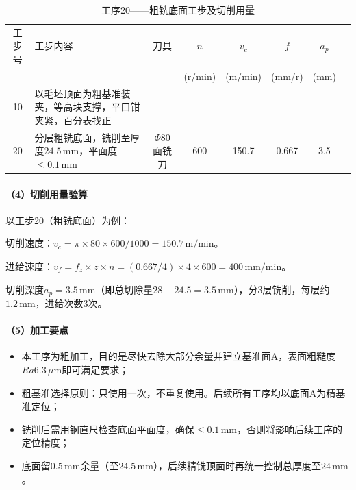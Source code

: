 \documentclass{xautCADreport}
\begin{document}
\begin{table}[H]
  \centering
  \caption{工序20——粗铣底面工步及切削用量}
  \label{tab:op20_die}
  \small
  \setlength{\tabcolsep}{5pt}
  \begin{tabular}{cp{4.5cm}cccccc}
    \toprule
    工步号 & 工步内容 & 刀具 & \multicolumn{1}{c}{$n$} & \multicolumn{1}{c}{$v_c$} & \multicolumn{1}{c}{$f$} & \multicolumn{1}{c}{$a_p$} \\
    & & & (r/min) & (m/min) & (mm/r) & (mm) \\
    \midrule
    10 & 以毛坯顶面为粗基准装夹，等高块支撑，平口钳夹紧，百分表找正 & — & — & — & — & — \\
    20 & 分层粗铣底面，铣削至厚度$24.5\,\mathrm{mm}$，平面度$\leq0.1\,\mathrm{mm}$ & $\Phi80$面铣刀 & 600 & 150.7 & 0.667 & 3.5 \\
    \bottomrule
  \end{tabular}
\end{table}

\paragraph{（4）切削用量验算}

以工步20（粗铣底面）为例：

切削速度：$v_c = \pi \times 80 \times 600 / 1000 = 150.7\,\mathrm{m/min}$。

进给速度：$v_f = f_z \times z \times n = (0.667/4) \times 4 \times 600 = 400\,\mathrm{mm/min}$。

切削深度$a_p=3.5\,\mathrm{mm}$（即总切除量$28-24.5=3.5\,\mathrm{mm}$），分3层铣削，每层约$1.2\,\mathrm{mm}$，进给次数3次。

\paragraph{（5）加工要点}

\begin{itemize}
  \item 本工序为粗加工，目的是尽快去除大部分余量并建立基准面A，表面粗糙度$Ra6.3\,\mu\mathrm{m}$即可满足要求；
  \item 粗基准选择原则：只使用一次，不重复使用。后续所有工序均以底面A为精基准定位；
  \item 铣削后需用钢直尺检查底面平面度，确保$\leq0.1\,\mathrm{mm}$，否则将影响后续工序的定位精度；
  \item 底面留$0.5\,\mathrm{mm}$余量（至$24.5\,\mathrm{mm}$），后续精铣顶面时再统一控制总厚度至$24\,\mathrm{mm}$。
\end{itemize}
\end{document}
